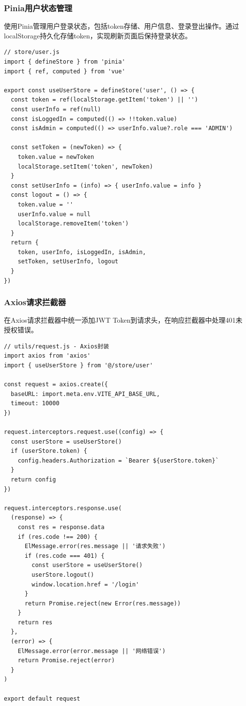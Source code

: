 \documentclass[12pt,a4paper]{article}
\begin{document}
\subsubsection{Pinia用户状态管理}

使用Pinia管理用户登录状态，包括token存储、用户信息、登录登出操作。通过localStorage持久化存储token，实现刷新页面后保持登录状态。

\begin{lstlisting}[language={}, caption=Pinia用户状态管理代码]
// store/user.js
import { defineStore } from 'pinia'
import { ref, computed } from 'vue'

export const useUserStore = defineStore('user', () => {
  const token = ref(localStorage.getItem('token') || '')
  const userInfo = ref(null)
  const isLoggedIn = computed(() => !!token.value)
  const isAdmin = computed(() => userInfo.value?.role === 'ADMIN')

  const setToken = (newToken) => {
    token.value = newToken
    localStorage.setItem('token', newToken)
  }
  const setUserInfo = (info) => { userInfo.value = info }
  const logout = () => {
    token.value = ''
    userInfo.value = null
    localStorage.removeItem('token')
  }
  return {
    token, userInfo, isLoggedIn, isAdmin,
    setToken, setUserInfo, logout
  }
})
\end{lstlisting}

\subsubsection{Axios请求拦截器}

在Axios请求拦截器中统一添加JWT Token到请求头，在响应拦截器中处理401未授权错误。

\begin{lstlisting}[language={}, caption=Axios封装代码]
// utils/request.js - Axios封装
import axios from 'axios'
import { useUserStore } from '@/store/user'

const request = axios.create({
  baseURL: import.meta.env.VITE_API_BASE_URL,
  timeout: 10000
})

request.interceptors.request.use((config) => {
  const userStore = useUserStore()
  if (userStore.token) {
    config.headers.Authorization = `Bearer ${userStore.token}`
  }
  return config
})

request.interceptors.response.use(
  (response) => {
    const res = response.data
    if (res.code !== 200) {
      ElMessage.error(res.message || '请求失败')
      if (res.code === 401) {
        const userStore = useUserStore()
        userStore.logout()
        window.location.href = '/login'
      }
      return Promise.reject(new Error(res.message))
    }
    return res
  },
  (error) => {
    ElMessage.error(error.message || '网络错误')
    return Promise.reject(error)
  }
)

export default request
\end{lstlisting}
\end{document}
